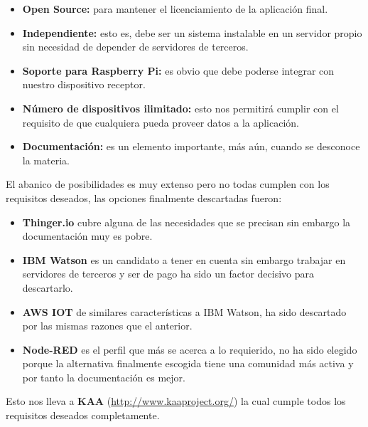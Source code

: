 \begin{itemize}
    \item \textbf{Open Source: } para mantener el licenciamiento de la aplicación final.
    \item \textbf{Independiente: } esto es, debe ser un sistema instalable en un servidor propio sin necesidad de depender de servidores de terceros.
    \item \textbf{Soporte para Raspberry Pi: } es obvio que debe poderse integrar con nuestro dispositivo receptor.
    \item \textbf{Número de dispositivos ilimitado: } esto nos permitirá cumplir con el requisito de que cualquiera pueda proveer datos a la aplicación.
    \item \textbf{Documentación: } es un elemento importante, más aún, cuando se desconoce la materia.
\end{itemize}

El abanico de posibilidades es muy extenso pero no todas cumplen con los requisitos deseados, las opciones finalmente descartadas fueron:
\begin{itemize}
    \item \textbf{Thinger.io} cubre alguna de las necesidades que se precisan sin embargo la documentación muy es pobre.
    \item \textbf{IBM Watson} es un candidato a tener en cuenta sin embargo trabajar en servidores de terceros y ser de pago ha sido un factor decisivo para descartarlo.
    \item \textbf{AWS IOT} de similares características a IBM Watson, ha sido descartado por las mismas razones que el anterior.
    \item \textbf{Node-RED} es el perfil que más se acerca a lo requierido, no ha sido elegido porque la alternativa finalmente escogida tiene una comunidad más activa y por tanto la documentación es mejor.
\end{itemize}

\bigskip

\newpage

Esto nos lleva a \textbf{KAA} (\url{http://www.kaaproject.org/}) la cual cumple todos los requisitos deseados completamente.

